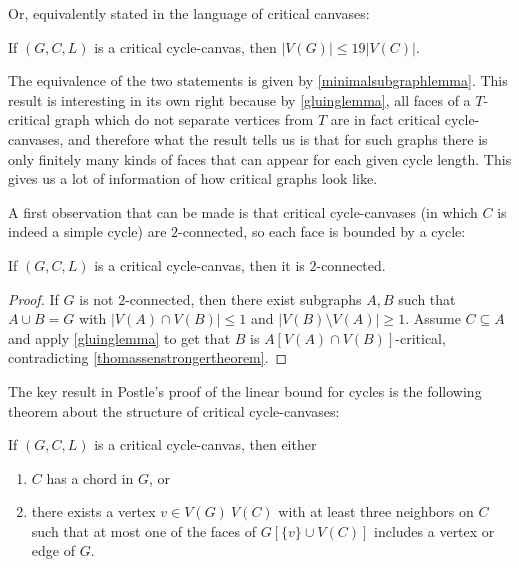 Or, equivalently stated in the language of critical canvases:

\begin{theorem}
If $(G, C, L)$ is a critical cycle-canvas, then $|V(G)| \leq 19 |V(C)|$.
\end{theorem}

The equivalence of the two statements is given by \ref{minimalsubgraphlemma}. This result is interesting in its own right because by \ref{gluinglemma}, all faces of a $T$-critical graph which do not separate vertices from $T$ are in fact critical cycle-canvases, and therefore what the result tells us is that for such graphs there is only finitely many kinds of faces that can appear for each given cycle length. This gives us a lot of information of how critical graphs look like. 

A first observation that can be made is that critical cycle-canvases (in which $C$ is indeed a simple cycle) are $2$-connected, so each face is bounded by a cycle:

\begin{lemma}
If $(G, C, L)$ is a critical cycle-canvas, then it is $2$-connected.
\end{lemma}

\begin{proof}
If $G$ is not $2$-connected, then there exist subgraphs $A, B$ such that $A \cup B = G$ with $|V(A) \cap V(B)| \leq 1$ and $|V(B) \setminus V(A)| \geq 1$. Assume $C \subseteq A$ and apply \ref{gluinglemma} to get that $B$ is $A[V(A) \cap V(B)]$-critical, contradicting \ref{thomassenstrongertheorem}.
\end{proof}

The key result in Postle's proof of the linear bound for cycles is the following theorem about the structure of critical cycle-canvases:

\begin{theorem}
\label{cyclechordtripodtheorem}
If $(G, C, L)$ is a critical cycle-canvas, then either

\begin{enumerate}
\item $C$ has a chord in $G$, or
\item there exists a vertex $v \in V(G) \ V(C)$ with at least three neighbors on $C$ such that at most one of the faces of $G[\{v\} \cup V(C)]$ includes a vertex or edge of $G$. 
\end{enumerate}
\end{theorem}

